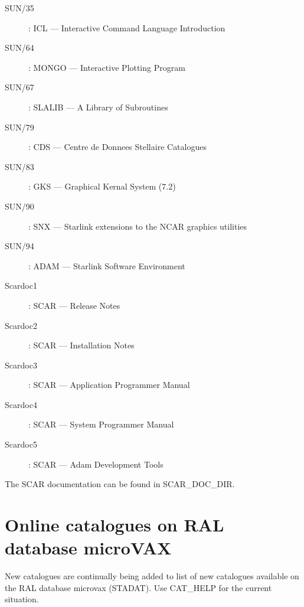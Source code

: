 \begin{description}
\item [SUN/35]: ICL --- Interactive Command Language Introduction
\item [SUN/64]: MONGO --- Interactive Plotting Program
\item [SUN/67]: SLALIB --- A Library of Subroutines
\item [SUN/79]: CDS --- Centre de Donnees Stellaire Catalogues
\item [SUN/83]: GKS --- Graphical Kernal System (7.2)
\item [SUN/90]: SNX --- Starlink extensions to the NCAR graphics utilities
\item [SUN/94]: ADAM --- Starlink Software Environment
\item [Scardoc1]: SCAR --- Release Notes
\item [Scardoc2]: SCAR --- Installation Notes
\item [Scardoc3]: SCAR --- Application Programmer Manual
\item [Scardoc4]: SCAR --- System Programmer Manual
\item [Scardoc5]: SCAR --- Adam Development Tools
\end{description}
The SCAR documentation can be found in SCAR\_DOC\_DIR.
\section {Online catalogues on RAL database microVAX}

New catalogues are continually being added to list of new catalogues available
on the RAL database microvax (STADAT). Use CAT\_HELP for the current situation.

